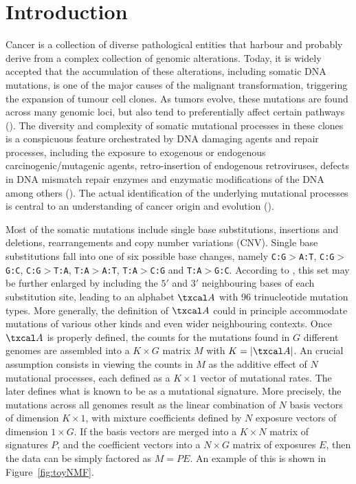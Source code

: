 \documentclass{bioinfo}
\begin{document}
\section{Introduction}
Cancer is a collection of diverse pathological entities that harbour
and probably derive from a complex collection of genomic
alterations. Today, it is widely accepted that the accumulation of
these alterations, including somatic DNA mutations, is one of 
the major causes of the malignant transformation, triggering the
expansion of tumour cell clones. As tumors evolve, these mutations
are found across many genomic loci, but also tend to
preferentially affect certain pathways (\citealp{CCSS}). The diversity
and complexity of somatic mutational processes in these clones is a
conspicuous feature orchestrated by DNA damaging agents and repair
processes, including the exposure to exogenous or endogenous
carcinogenic/mutagenic agents, retro-insertion of endogenous
retroviruses, defects in DNA mismatch repair enzymes and enzymatic
modifications of the DNA among others (\citealp{RG}). The actual
identification of the underlying mutational processes is central to an
understanding of cancer origin and evolution (\citealp{ANat, AS, HEN,
RG}).


Most of the somatic mutations include single base substitutions,
insertions and deletions, rearrangements and copy number variations
(CNV). Single base substitutions fall into one of six possible base
changes, namely \texttt{C:G}$>$\texttt{A:T},
\texttt{C:G}$>$\texttt{G:C}, \texttt{C:G}$>$\texttt{T:A},
\texttt{T:A}$>$\texttt{A:T}, \texttt{T:A}$>$\texttt{C:G} and
\texttt{T:A}$>$\texttt{G:C}. According to \cite{A}, this set may be
further enlarged by including the $5'$ and $3'$ neighbouring bases of
each substitution site, leading to an alphabet $\txcal A$ with 96
trinucleotide mutation types. More generally, the definition of
$\txcal A$ could in principle accommodate mutations of various other
kinds
and even wider neighbouring contexts. Once $\txcal A$
is properly defined, the counts for the mutations found in $G$
different genomes are assembled into a $K\times G$ matrix $M$ with $K
= |\txcal A|$. An crucial assumption consists in viewing the counts
in $M$ as the additive effect of $N$ mutational processes, each
defined as a $K\times 1$ vector of mutational rates. The later defines
what is known to be as a mutational signature. More precisely, the
mutations across all genomes result as the linear combination of $N$
basis vectors of dimension $K\times 1$, with mixture coefficients
defined by $N$ exposure vectors of dimension $1 \times G$. If the
basis vectors are merged into a $K\times N$ matrix of signatures $P$,
and the coefficient vectors into a $N\times G$ matrix of exposures
$E$, then the data can be simply factored as $M=PE$. An example of
this is shown in Figure~\ref{fig:toyNMF}. 
\end{document}
